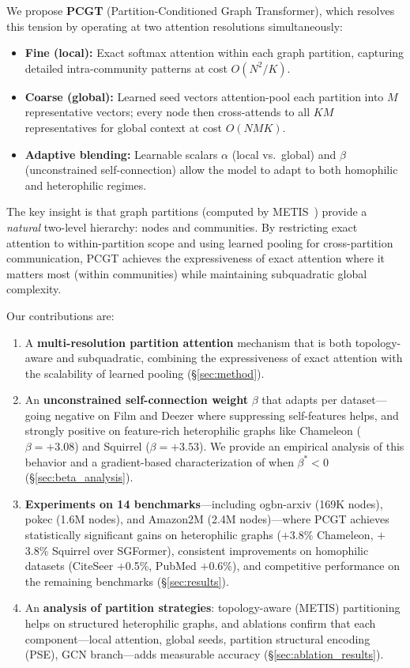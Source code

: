 \documentclass[manuscript, screen, review, anonymous]{acmart}
\begin{document}
We propose \textbf{PCGT} (Partition-Conditioned Graph Transformer), which resolves this tension by operating at two attention resolutions simultaneously:
\begin{itemize}
\item \textbf{Fine (local):} Exact softmax attention within each graph partition, capturing detailed intra-community patterns at cost $O(N^2/K)$.
\item \textbf{Coarse (global):} Learned seed vectors attention-pool each partition into $M$ representative vectors; every node then cross-attends to all $KM$ representatives for global context at cost $O(NMK)$.
\item \textbf{Adaptive blending:} Learnable scalars $\alpha$ (local vs.\ global) and $\beta$ (unconstrained self-connection) allow the model to adapt to both homophilic and heterophilic regimes.
\end{itemize}

The key insight is that graph partitions (computed by METIS~\cite{karypis1998metis}) provide a \emph{natural} two-level hierarchy: nodes and communities. By restricting exact attention to within-partition scope and using learned pooling for cross-partition communication, PCGT achieves the expressiveness of exact attention where it matters most (within communities) while maintaining subquadratic global complexity.

Our contributions are:
\begin{enumerate}
\item A \textbf{multi-resolution partition attention} mechanism that is both topology-aware and subquadratic, combining the expressiveness of exact attention with the scalability of learned pooling (\S\ref{sec:method}).

\item An \textbf{unconstrained self-connection weight} $\beta$ that adapts per dataset---going negative on Film and Deezer where suppressing self-features helps, and strongly positive on feature-rich heterophilic graphs like Chameleon ($\beta = +3.08$) and Squirrel ($\beta = +3.53$). We provide an empirical analysis of this behavior and a gradient-based characterization of when $\beta^* < 0$ (\S\ref{sec:beta_analysis}).

\item \textbf{Experiments on 14 benchmarks}---including ogbn-arxiv (169K nodes), pokec (1.6M nodes), and Amazon2M (2.4M nodes)---where PCGT achieves statistically significant gains on heterophilic graphs ($+$3.8\% Chameleon, $+$3.8\% Squirrel over SGFormer), consistent improvements on homophilic datasets (CiteSeer $+$0.5\%, PubMed $+$0.6\%), and competitive performance on the remaining benchmarks (\S\ref{sec:results}).

\item An \textbf{analysis of partition strategies}: topology-aware (METIS) partitioning helps on structured heterophilic graphs, and ablations confirm that each component---local attention, global seeds, partition structural encoding (PSE), GCN branch---adds measurable accuracy (\S\ref{sec:ablation_results}).
\end{enumerate}
\end{document}

